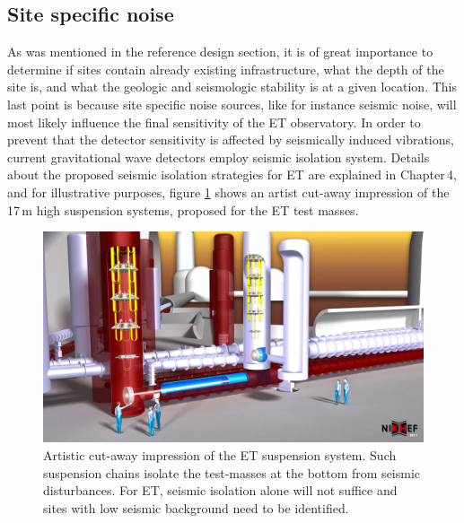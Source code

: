 \subsection{Site specific noise}
As was mentioned in the reference design section, it is of great importance to determine if sites contain already existing infrastructure, what the depth of the site is, and what the geologic and seismologic stability is at a given location. This last point is because site specific noise sources, like for instance seismic noise, will most likely influence the final sensitivity of the ET observatory. In order to prevent that the detector sensitivity is affected by seismically induced vibrations, current gravitational wave detectors employ seismic isolation system. Details about the proposed seismic isolation strategies for ET are explained in Chapter\,4, and for illustrative purposes, figure \ref{SuspensionArtistic} shows an artist cut-away impression of the 17\,m high suspension systems, proposed for the ET test masses. 
\begin{figure}[h!]
	\begin{center}
		 \includegraphics[width=17cm]{./Sec_SiteInfra/Figures/SuspensionArtistic2.jpg}
			\caption{Artistic cut-away impression of the ET suspension system. Such suspension chains isolate the test-masses at the bottom from seismic disturbances. For ET, seismic isolation alone will not suffice and sites with low seismic background need to be identified.}		
			\label{SuspensionArtistic}
	\end{center}
\end{figure}


